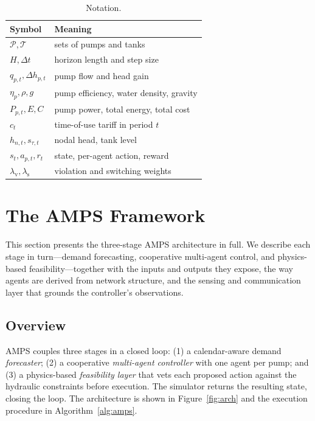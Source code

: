 \documentclass[11pt,a4paper]{article}
\begin{document}
\begin{table}[H]
\centering
\caption{Notation.}
\label{tab:notation}
\begin{tabularx}{\textwidth}{@{}lY@{}}
\toprule
Symbol & Meaning \\
\midrule
$\mathcal{P}, \mathcal{T}$ & sets of pumps and tanks \\
$H, \Delta t$ & horizon length and step size \\
$q_{p,t}, \Delta h_{p,t}$ & pump flow and head gain \\
$\eta_p, \rho, g$ & pump efficiency, water density, gravity \\
$P_{p,t}, E, C$ & pump power, total energy, total cost \\
$c_t$ & time-of-use tariff in period $t$ \\
$h_{n,t}, s_{\tau,t}$ & nodal head, tank level \\
$s_t, a_{p,t}, r_t$ & state, per-agent action, reward \\
$\lambda_{\mathrm{v}}, \lambda_{\mathrm{s}}$ & violation and switching weights \\
\bottomrule
\end{tabularx}
\end{table}

\section{The AMPS Framework}
\label{sec:framework}

\noindent This section presents the three-stage AMPS architecture in full. We
describe each stage in turn---demand forecasting, cooperative multi-agent
control, and physics-based feasibility---together with the inputs and outputs
they expose, the way agents are derived from network structure, and the sensing
and communication layer that grounds the controller's observations.

\subsection{Overview}
AMPS couples three stages in a closed loop: (1) a calendar-aware demand
\emph{forecaster}; (2) a cooperative \emph{multi-agent controller} with one agent
per pump; and (3) a physics-based \emph{feasibility layer} that vets each
proposed action against the hydraulic constraints before execution. The
simulator returns the resulting state, closing the loop. The architecture is
shown in Figure~\ref{fig:arch} and the execution procedure in
Algorithm~\ref{alg:amps}.
\end{document}
